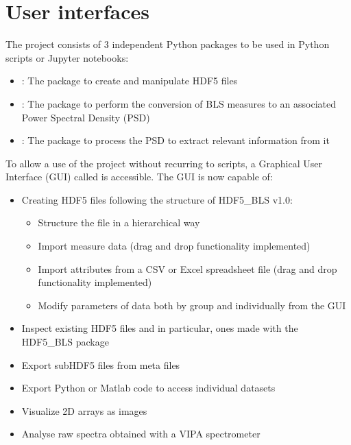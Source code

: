 \documentclass[letterpaper,10pt,english]{sphinxmanual}
\begin{document}
\section{User interfaces}
\label{\detokenize{source/project:user-interfaces}}
\sphinxAtStartPar
The project consists of 3 independent Python packages to be used in Python scripts or Jupyter notebooks:
\begin{itemize}
\item {} 
\sphinxAtStartPar
{}: The package to create and manipulate HDF5 files

\item {} 
\sphinxAtStartPar
{}: The package to perform the conversion of BLS measures to an associated Power Spectral Density (PSD)

\item {} 
\sphinxAtStartPar
{}: The package to process the PSD to extract relevant information from it

\end{itemize}

\sphinxAtStartPar
To allow a use of the project without recurring to scripts, a Graphical User Interface (GUI) called  is accessible.
The GUI is now capable of:
\begin{itemize}
\item {} 
\sphinxAtStartPar
Creating HDF5 files following the structure of HDF5\_BLS v1.0:
\begin{itemize}
\item {} 
\sphinxAtStartPar
Structure the file in a hierarchical way

\item {} 
\sphinxAtStartPar
Import measure data (drag and drop functionality implemented)

\item {} 
\sphinxAtStartPar
Import attributes from a CSV or Excel spreadsheet file (drag and drop functionality implemented)

\item {} 
\sphinxAtStartPar
Modify parameters of data both by group and individually from the GUI

\end{itemize}

\item {} 
\sphinxAtStartPar
Inspect existing HDF5 files and in particular, ones made with the HDF5\_BLS package

\item {} 
\sphinxAtStartPar
Export sub\sphinxhyphen{}HDF5 files from meta files

\item {} 
\sphinxAtStartPar
Export Python or Matlab code to access individual datasets

\item {} 
\sphinxAtStartPar
Visualize 2D arrays as images

\item {} 
\sphinxAtStartPar
Analyse raw spectra obtained with a VIPA spectrometer

\end{itemize}
\end{document}
